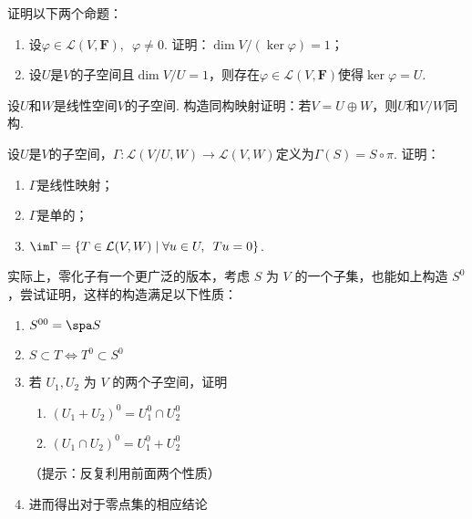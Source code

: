 \begin{summary}

\end{summary}

\begin{exercise}

    \begin{exgroup}
        \item 证明以下两个命题：
        \begin{enumerate}
            \item 设$\varphi\in \mathcal{L}(V,\mathbf{F}),\enspace\varphi\neq 0$. 证明：$\dim V/(\ker\varphi)=1$；

            \item 设$U$是$V$的子空间且$\dim V/U=1$，则存在$\varphi\in \mathcal{L}(V,\mathbf{F})$使得$\ker\varphi=U$.
        \end{enumerate}
    \end{exgroup}

    \begin{exgroup}
        \item 设$U$和$W$是线性空间$V$的子空间. 构造同构映射证明：若$V=U\oplus W$，则$U$和$V/W$同构.

        \item 设$U$是$V$的子空间，$\Gamma:\mathcal{L}(V/U,W)\to \mathcal{L}(V,W)$定义为$\Gamma(S)=S\circ\pi$. 证明：
        \begin{enumerate}
            \item $\Gamma$是线性映射；

            \item $\Gamma$是单的；

            \item $\im\Gamma=\{T\in \mathcal{L}(V,W) \mid \forall u\in U,\enspace Tu=0\}$.
        \end{enumerate}

        \item 实际上，零化子有一个更广泛的版本，考虑 $S$ 为 $V$ 的一个子集，也能如上构造 $S^0$，尝试证明，这样的构造满足以下性质：
        \begin{enumerate}
            \item $S^{00} = \spa S$
            \item $S \subset T \iff T^0 \subset S^0$
            \item 若 $U_1, U_2$ 为 $V$ 的两个子空间，证明 \begin{enumerate}
                      \item $(U_1 + U_2)^0 = U_1^0 \cap U_2^0$
                      \item $(U_1 \cap U_2)^0 = U_1^0 + U_2^0$
                  \end{enumerate}（提示：反复利用前面两个性质）
            \item 进而得出对于零点集的相应结论
        \end{enumerate}
    \end{exgroup}

    \begin{exgroup}
        \item
    \end{exgroup}
\end{exercise}
